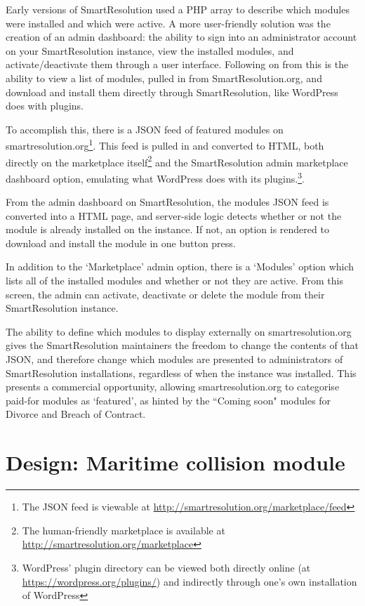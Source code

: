 Early versions of SmartResolution used a PHP array to describe which modules were installed and which were active. A more user-friendly solution was the creation of an admin dashboard: the ability to sign into an administrator account on your SmartResolution instance, view the installed modules, and activate/deactivate them through a user interface. Following on from this is the ability to view a list of modules, pulled in from SmartResolution.org, and download and install them directly through SmartResolution, like WordPress does with plugins.

To accomplish this, there is a JSON feed of featured modules on smartresolution.org\footnote{The JSON feed is viewable at \url{http://smartresolution.org/marketplace/feed}}. This feed is pulled in and converted to HTML, both directly on the marketplace itself\footnote{The human-friendly marketplace is available at \url{http://smartresolution.org/marketplace}} and the SmartResolution admin marketplace dashboard option, emulating what WordPress does with its plugins.\footnote{WordPress' plugin directory can be viewed both directly online (at \url{https://wordpress.org/plugins/}) and indirectly through one's own installation of WordPress}.

From the admin dashboard on SmartResolution, the modules JSON feed is converted into a HTML page, and server-side logic detects whether or not the module is already installed on the instance. If not, an option is rendered to download and install the module in one button press.

In addition to the `Marketplace' admin option, there is a `Modules' option which lists all of the installed modules and whether or not they are active. From this screen, the admin can activate, deactivate or delete the module from their SmartResolution instance.

The ability to define which modules to display externally on smartresolution.org gives the SmartResolution maintainers the freedom to change the contents of that JSON, and therefore change which modules are presented to administrators of SmartResolution installations, regardless of when the instance was installed. This presents a commercial opportunity, allowing smartresolution.org to categorise paid-for modules as `featured', as hinted by the ``Coming soon" modules for Divorce and Breach of Contract.

\section{Design: Maritime collision module}

